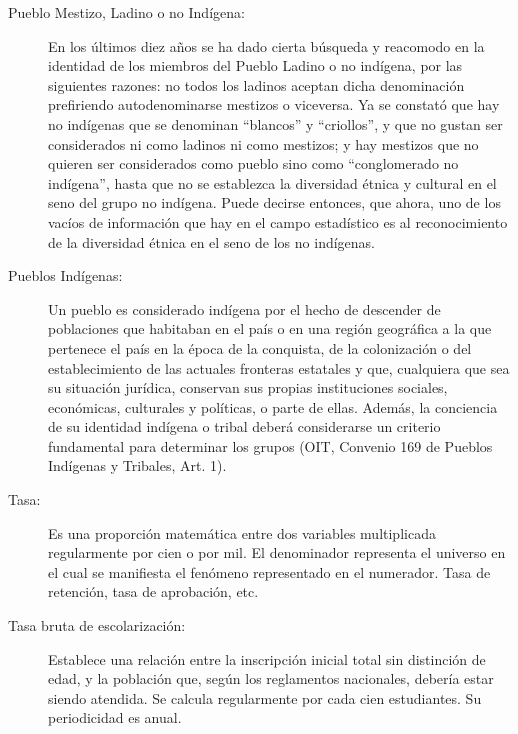 \begin{description}
\item[Pueblo Mestizo, Ladino o no Indígena:  ] En los últimos diez años se ha dado cierta búsqueda y reacomodo en la identidad de los miembros del Pueblo Ladino o no indígena, por las siguientes razones: no todos los ladinos aceptan dicha denominación prefiriendo autodenominarse mestizos o viceversa. Ya se constató que hay no indígenas que se denominan “blancos” y “criollos”, y que no gustan ser considerados ni como ladinos ni como mestizos; y hay mestizos que no quieren ser considerados como pueblo sino como “conglomerado no indígena”, hasta que no se establezca la diversidad étnica y cultural en el seno del grupo no indígena. Puede decirse entonces, que ahora, uno de los vacíos de información que hay en el campo estadístico es al reconocimiento de la diversidad étnica en el seno de los no indígenas.
\item[Pueblos Indígenas:  ] Un pueblo es considerado indígena por el hecho de descender de poblaciones que habitaban en el país o en una región geográfica a la que pertenece el país en la época de la conquista, de la colonización o del establecimiento de las actuales fronteras estatales y que, cualquiera que sea su situación jurídica, conservan sus propias instituciones sociales, económicas, culturales y políticas, o parte de ellas. Además, la conciencia de su identidad indígena o tribal deberá considerarse un criterio fundamental para determinar los grupos (OIT, Convenio 169 de Pueblos Indígenas y Tribales, Art. 1).
\item[Tasa:  ] Es una proporción matemática entre dos variables multiplicada regularmente por cien o por mil. El denominador representa el universo en el cual se manifiesta el fenómeno representado en el numerador. Tasa de retención, tasa de aprobación, etc.
\item[Tasa bruta de escolarización: ] Establece una relación entre la inscripción inicial total sin distinción de edad, y la población que, según los reglamentos nacionales, debería estar siendo atendida. Se calcula regularmente por cada cien estudiantes. Su periodicidad es anual.


\end{description}
